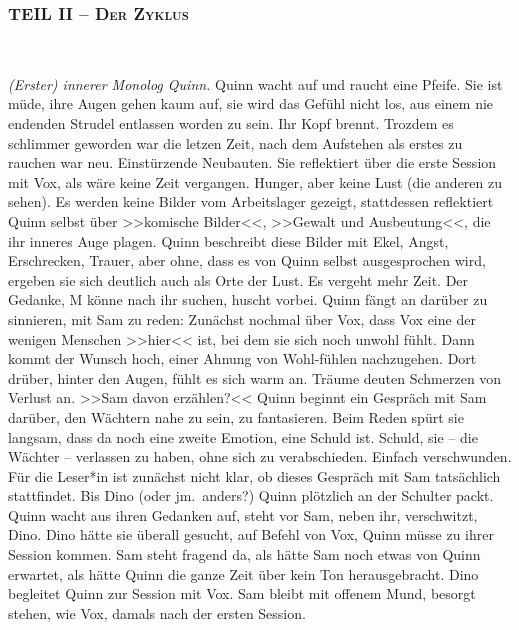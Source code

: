 \subsubsection{\textsc{TEIL II -- Der Zyklus}}
%
\begin{center}
  \qdots{}\\
\end{center}
\bigskip
%
\emph{(Erster) innerer Monolog Quinn.}
Quinn wacht auf und raucht eine Pfeife. 
Sie ist müde, ihre Augen gehen kaum auf, sie wird das Gefühl nicht los, aus
einem nie endenden Strudel entlassen worden zu sein. 
Ihr Kopf brennt.
Trozdem es schlimmer geworden war die letzen Zeit, nach dem Aufstehen als erstes
zu rauchen war neu. 
Einstürzende Neubauten. 
Sie reflektiert über die erste Session mit Vox, als wäre keine Zeit vergangen. 
Hunger, aber keine Lust (die anderen zu sehen). 
Es werden keine Bilder vom Arbeitslager gezeigt, stattdessen reflektiert Quinn
selbst über >>komische Bilder<<, >>Gewalt und Ausbeutung<<, die ihr inneres Auge
plagen. 
Quinn beschreibt diese Bilder mit Ekel, Angst, Erschrecken, Trauer, aber ohne,
dass es von Quinn selbst ausgesprochen wird, ergeben sie sich deutlich auch als
Orte der Lust.
Es vergeht mehr Zeit. 
Der Gedanke, M könne nach ihr suchen, huscht vorbei. 
Quinn fängt an darüber zu sinnieren, mit Sam zu reden:
Zunächst nochmal über Vox, dass Vox eine der wenigen Menschen >>hier<< ist, bei
dem sie sich noch unwohl fühlt.
Dann kommt der Wunsch hoch, einer Ahnung von Wohl-fühlen nachzugehen. 
Dort drüber, hinter den Augen, fühlt es sich warm an. 
Träume deuten Schmerzen von Verlust an. 
>>Sam davon erzählen?<<
Quinn beginnt ein Gespräch mit Sam darüber, den Wächtern nahe zu sein, zu
fantasieren.
Beim Reden spürt sie langsam, dass da noch eine zweite Emotion, eine Schuld
ist. 
Schuld, sie -- die Wächter -- verlassen zu haben, ohne sich zu verabschieden.
Einfach verschwunden. 
Für die Leser*in ist zunächst nicht klar, ob dieses Gespräch mit Sam tatsächlich
stattfindet. 
Bis Dino (oder jm.~anders?) Quinn plötzlich an der Schulter packt. 
Quinn wacht aus ihren Gedanken auf, steht vor Sam, neben ihr, verschwitzt, Dino.
Dino hätte sie überall gesucht, auf Befehl von Vox, Quinn müsse zu ihrer Session
kommen. 
Sam steht fragend da, als hätte Sam noch etwas von Quinn erwartet, als hätte
Quinn die ganze Zeit über kein Ton herausgebracht. 
Dino begleitet Quinn zur Session mit Vox. 
Sam bleibt mit offenem Mund, besorgt stehen, wie Vox, damals nach der ersten
Session.\\\\
